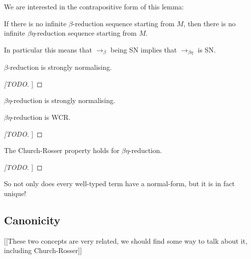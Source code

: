 We are interested in the contrapositive form of this lemma:

\begin{cor}
    If there is no infinite $\beta$-reduction sequence starting from $M$, then there is no infinite $\beta \eta$-reduction sequence starting from $M$.
\end{cor}

\begin{remark}
    In particular this means that $\to_{\beta}$ being SN implies that $\to_{\beta \eta}$ is SN.
\end{remark}

\begin{theorem}
    $\beta$-reduction is strongly normalising.
\end{theorem}

\begin{proof}
    [[TODO]]
\end{proof}

\begin{cor}
    $\beta \eta$-reduction is strongly normalising.
\end{cor}

\begin{lemma}
    $\beta \eta$-reduction is WCR.
\end{lemma}

\begin{proof}
    [[TODO]]
\end{proof}

\begin{theorem}
    The Church-Rosser property holds for $\beta \eta$-reduction.
\end{theorem}

\begin{proof}
    [[TODO]]
\end{proof}

\begin{remark}
    So not only does every well-typed term have a normal-form, but it is in fact unique!
\end{remark}

\subsection{Canonicity}



[[These two concepts are very related, we should find some way to talk about it, including Church-Rosser]]
